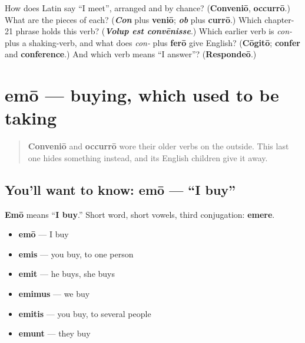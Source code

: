 \begin{tcolorbox}[breakable,colback=teal!4,colframe=teal!35!black,title={Before you move on}]
How does Latin say \textquotedblleft{}I meet\textquotedblright{}, arranged and by chance? (\textbf{Conveniō}, \textbf{occurrō}.) What are the pieces of each? (\emph{\textbf{Con}} plus \textbf{veniō}; \emph{\textbf{ob}} plus \textbf{currō}.) Which chapter-21 phrase holds this verb? (\emph{\textbf{Volup est convēnisse}}.) Which earlier verb is \emph{con-} plus a shaking-verb, and what does \emph{con-} plus \textbf{ferō} give English? (\textbf{Cōgitō}; \textbf{confer} and \textbf{conference}.) And which verb means \textquotedblleft{}I answer\textquotedblright{}? (\textbf{Respondeō}.)
\end{tcolorbox}
\section[emō, emere]{emō — buying, which used to be taking}

\label{lesson:LA-C43-emo}



\begin{quote}
\textbf{Conveniō} and \textbf{occurrō} wore their older verbs on the outside. This last one hides something instead, and its English children give it away.
\end{quote}

\subsection*{You'll want to know: emō — \textquotedblleft{}I buy\textquotedblright{}}
\textbf{Emō} means \textquotedblleft{}\textbf{I buy}.\textquotedblright{} Short word, short vowels, third conjugation: \textbf{emere}.

\begin{itemize}
\raggedright
  \item \textbf{emō} — I buy
  \item \textbf{emis} — you buy, to one person
  \item \textbf{emit} — he buys, she buys
  \item \textbf{emimus} — we buy
  \item \textbf{emitis} — you buy, to several people
  \item \textbf{emunt} — they buy
\end{itemize}

